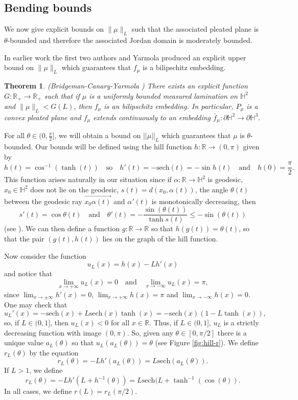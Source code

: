 \documentclass{amsart}
\theoremstyle{plain}
\newtheorem{theorem}[proposition]{Theorem}
\theoremstyle{definition}
\theoremstyle{remark}
\newcommand{\R}{\mathbb R}
\newcommand{\sech}{{\mathrm{sech}}}
\newcommand{\<}{\left <}
\renewcommand{\>}{\right >}
\begin{document}
\subsection{Bending bounds}
We now give explicit bounds on $\|\mu\|_L$ such that the associated pleated plane is $\theta$-bounded and therefore the associated Jordan domain  is moderately bounded.

In earlier work \cite{BCY} the first two authors and  Yarmola produced an explicit upper bound on  $\|\mu\|_L$ which guarantees that $f_\mu$ is a bilipschitz embedding.

\begin{theorem}{\rm (Bridgeman-Canary-Yarmola \cite{BCY})}
\label{BCY}
There exists an explicit function $G:\R_+\rightarrow\R_+$ such that if $\mu$ is a uniformly bounded measured lamination on
$\mathbb H^2$ and $\|\mu\|_L < G(L)$, then $f_\mu$ is an  bilipschitz embedding. In particular,  $P_\mu$ is a convex pleated plane
and $f_\mu$ extends continuously to an embedding
$\bar f_\mu:\partial\mathbb H^2\to\partial \mathbb H^3.$
\end{theorem}



For all $\theta\in (0,\frac{\pi}{2}]$, we will obtain a bound on $||\mu||_L$ which guarantees that $\mu$ is $\theta$-bounded.
Our bounds will be defined using the hill function $h:\R\rightarrow (0,\pi)$ given by
$$h(t) = \cos^{-1}(\tanh(t))\quad\text{so}\quad h'(t)=-\sech(t)=-\sin h(t)\quad\text{and}\quad h(0)=\frac{\pi}{2}.$$
This function arises naturally in our situation since if $\alpha:\R\to\mathbb H^2$ is geodesic,
$x_0\in\mathbb H^2$ does not lie on the geodesic, $s(t)=d(x_0,\alpha(t))$, the angle 
$\theta(t)$ between the geodesic ray $\overrightarrow{x_0\alpha(t)}$ and $\alpha'(t)$ is monotonically decreasing,
then
$$s'(t)=\cos \theta(t)  \quad\text{and}\quad \theta'(t)=-\frac{\sin(\theta(t))}{\tanh s(t)}\le -\sin(\theta(t))$$
(see \cite[Lemma 4.4]{EMM}). 
We can then define a function $g:\R\to\R$ so that $h(g(t))=\theta(t)$, so that
the pair $(g(t), h(t))$ lies on the graph of the hill function.

Now consider the function
$$u_L(x) = h(x) -Lh'(x)$$
and notice that
$$\lim_{x\to +\infty} u_L(x)=0\quad\text{and}\quad \lim_{x\to -\infty} u_L(x)=\pi,$$
since $\lim_{x\to\pm\infty}h'(x)=0$, $\lim_{x\to+\infty} h(x)=\pi$ and $\lim_{x\to-\infty} h(x)=0.$
One may check that
$$u_L'(x) = -\sech(x) +L\sech(x)\tanh(x) = -\sech(x)(1-L\tanh(x)),$$  
so, if $L\in(0,1]$, then $u_L(x)<0$ for all $x\in\R$. Thus, if $L\in(0,1]$,
$u_L$ is a strictly decreasing function with image $(0, \pi)$.
So, given any $\theta \in [0,\pi/2]$ there is a unique value $a_L(\theta)$ so that $u_L(a_L(\theta)) = \theta$ (see Figure \ref{fig:hill-r}).  
We define $r_L(\theta)$ by the equation
$$r_L(\theta) = -Lh'(a_L(\theta))= L\sech(a_L(\theta)).$$  
If $L>1$, we define
$$r_L(\theta) =  -Lh'(L+h^{-1}(\theta)) = L\sech(L+\tanh^{-1}(\cos(\theta)).$$
In all cases, we define  $r(L) = r_L(\pi/2)$. 
\end{document}
